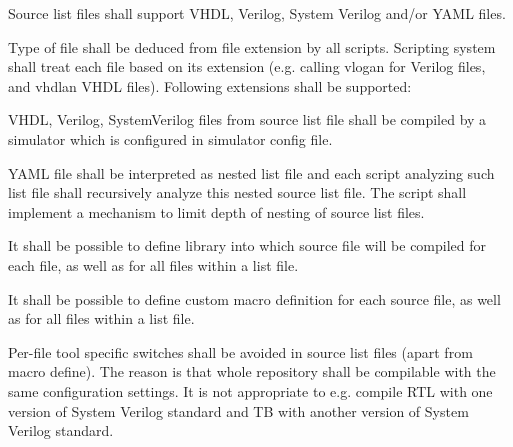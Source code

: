 \documentclass{tropic_design_spec}
\begin{document}

    {Source list files shall support VHDL, Verilog, System Verilog and/or YAML files}.


    {Type of file shall be deduced from file extension by all scripts. Scripting system
     shall treat each file based on its extension (e.g. calling vlogan for Verilog files,
     and vhdlan VHDL files). Following extensions shall be supported:}
\ReqSubStart
\ReqSubEnd


    {VHDL, Verilog, SystemVerilog files from source list file shall be compiled by a      
     simulator which is configured in simulator config file.}


    {YAML file shall be interpreted as nested list file and each script analyzing such
     list file shall recursively analyze this nested source list file. The script shall
     implement a mechanism to limit depth of nesting of source list files.}


    {It shall be possible to define library into which source file will be compiled for
     each file, as well as for all files within a list file.}


    {It shall be possible to define custom macro definition for each source file, as well
     as for all files within a list file.}


    {Per-file tool specific switches shall be avoided in source list files (apart from
     macro define). The reason is that whole repository shall be compilable with the same
     configuration settings. It is not appropriate to e.g. compile RTL with one version
     of System Verilog standard and TB with another version of System Verilog standard.}
\end{document}
